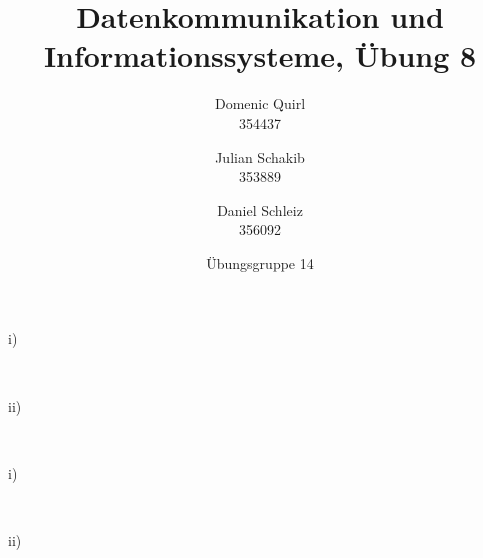 \documentclass{../exercisesheet}
\title{Datenkommunikation und Informationssysteme, Übung 8}
\author{
    Domenic Quirl \\ 354437
    \and
    Julian Schakib \\ 353889
    \and 
    Daniel Schleiz \\ 356092
}
\date{Übungsgruppe 14}
\begin{document}
\maketitle
\pointtable


\begin{exercise}{6}
\begin{subexercise}

\end{subexercise}
\begin{subexercise}
\begin{description}
\item[i)] \ \\

\item[ii)] \ \\

\end{description}
\end{subexercise}
\begin{subexercise}

\end{subexercise}
\end{exercise}


\begin{exercise}{4}
\begin{subexercise}
\begin{description}
\item[i)] \ \\

\item[ii)] \ \\

\end{description}
\end{subexercise}
\begin{subexercise}

\end{subexercise}
\end{exercise}
\end{document}
